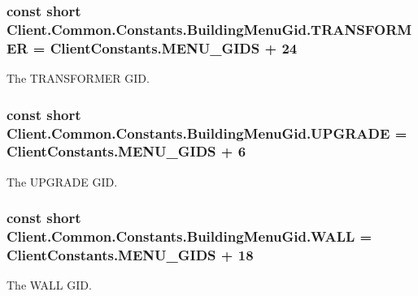 \subsubsection[{T\+R\+A\+N\+S\+F\+O\+R\+M\+E\+R}]{\setlength{\rightskip}{0pt plus 5cm}const short Client.\+Common.\+Constants.\+Building\+Menu\+Gid.\+T\+R\+A\+N\+S\+F\+O\+R\+M\+E\+R = {\bf Client\+Constants.\+M\+E\+N\+U\+\_\+\+G\+I\+D\+S} + 24}\label{classClient_1_1Common_1_1Constants_1_1BuildingMenuGid_a8d4e14fc466f4769735c2784cab11f03}


The T\+R\+A\+N\+S\+F\+O\+R\+M\+E\+R G\+I\+D. 

\hypertarget{classClient_1_1Common_1_1Constants_1_1BuildingMenuGid_a1bfbcae011676ac021301688aec0fb04}{}
\subsubsection[{U\+P\+G\+R\+A\+D\+E}]{\setlength{\rightskip}{0pt plus 5cm}const short Client.\+Common.\+Constants.\+Building\+Menu\+Gid.\+U\+P\+G\+R\+A\+D\+E = {\bf Client\+Constants.\+M\+E\+N\+U\+\_\+\+G\+I\+D\+S} + 6}\label{classClient_1_1Common_1_1Constants_1_1BuildingMenuGid_a1bfbcae011676ac021301688aec0fb04}


The U\+P\+G\+R\+A\+D\+E G\+I\+D. 

\hypertarget{classClient_1_1Common_1_1Constants_1_1BuildingMenuGid_a1cb772eccafaf5bd7ba8309543bb3e27}{}
\subsubsection[{W\+A\+L\+L}]{\setlength{\rightskip}{0pt plus 5cm}const short Client.\+Common.\+Constants.\+Building\+Menu\+Gid.\+W\+A\+L\+L = {\bf Client\+Constants.\+M\+E\+N\+U\+\_\+\+G\+I\+D\+S} + 18}\label{classClient_1_1Common_1_1Constants_1_1BuildingMenuGid_a1cb772eccafaf5bd7ba8309543bb3e27}


The W\+A\+L\+L G\+I\+D. 

